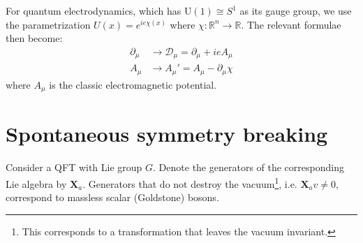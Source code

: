 	\begin{example}[QED]
		For quantum electrodynamics, which has U$(1)\cong S^1$ as its gauge group, we use the parametrization $U(x) = e^{ie\chi(x)}$ where $\chi:\mathbb{R}^n\rightarrow\mathbb{R}$. The relevant formulae then become:
		\begin{align}
			\partial_\mu &\longrightarrow \mathcal{D}_\mu = \partial_\mu + ieA_\mu\\
			A_\mu &\longrightarrow A_\mu' = A_\mu - \partial_\mu\chi
		\end{align}
		where $A_\mu$ is the classic electromagnetic potential.
	\end{example}

\section{Spontaneous symmetry breaking}

	\begin{theorem}[Goldstone]
		Consider a QFT with Lie group $G$. Denote the generators of the corresponding Lie algebra by $\mathbf{X}_a$. Generators that do not destroy the vacuum\footnote{This corresponds to a transformation that leaves the vacuum invariant.}, i.e. $\mathbf{X}_av\neq0$, correspond to massless scalar (Goldstone) bosons.
	\end{theorem}
